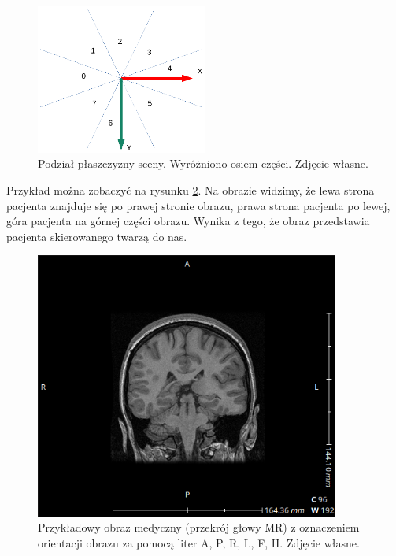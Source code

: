 \begin{figure}[!htbp]
    \centering
    \includegraphics[width=0.5\textwidth]{img/imageorientationindicator-004.pdf}
    \caption{Podział płaszczyzny sceny. Wyróżniono osiem części. Zdjęcie własne.} 
    \label{fig:imageorientationindicator4}
\end{figure}

\par
Przykład można zobaczyć na rysunku \ref{fig:imageorientationindicator1}.
Na obrazie widzimy, że lewa strona pacjenta znajduje się po prawej stronie obrazu, prawa strona pacjenta po lewej, góra pacjenta na górnej części obrazu.
Wynika z tego, że obraz przedstawia pacjenta skierowanego twarzą do nas.

\begin{figure}[!htbp]
    \centering
    \includegraphics[width=100mm]{img/imageorientationindicator-002.png}
    \caption{Przykładowy obraz medyczny (przekrój głowy MR) z oznaczeniem orientacji obrazu za pomocą liter A, P, R, L, F, H. Zdjęcie własne.}
    \label{fig:imageorientationindicator1}
\end{figure}
